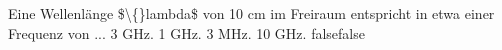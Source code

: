     {Eine Wellenlänge \$\textbackslash\{\}lambda\$ von 10 cm im Freiraum entspricht in etwa einer Frequenz von ...}
    {3 GHz.}
    {1 GHz.}
    {3 MHz.}
    {10 GHz.}
    {false}{false}